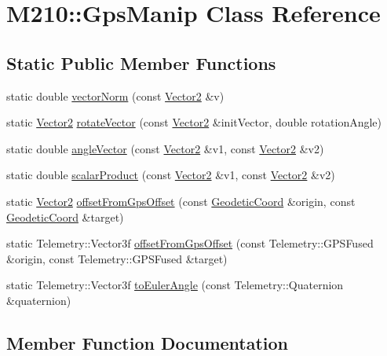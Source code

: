 \hypertarget{class_m210_1_1_gps_manip}{}\section{M210\+:\+:Gps\+Manip Class Reference}
\label{class_m210_1_1_gps_manip}
\subsection*{Static Public Member Functions}
\begin{DoxyCompactItemize}
\item 
static double \mbox{\hyperlink{class_m210_1_1_gps_manip_a8703f003ce3fde60baf51473dd3ec6b7}{vector\+Norm}} (const \mbox{\hyperlink{struct_vector2}{Vector2}} \&v)
\item 
static \mbox{\hyperlink{struct_vector2}{Vector2}} \mbox{\hyperlink{class_m210_1_1_gps_manip_ad3bf0e3449554a4d644316fec52dfa4c}{rotate\+Vector}} (const \mbox{\hyperlink{struct_vector2}{Vector2}} \&init\+Vector, double rotation\+Angle)
\item 
static double \mbox{\hyperlink{class_m210_1_1_gps_manip_a0036870394e772796ff3090bc03bc1de}{angle\+Vector}} (const \mbox{\hyperlink{struct_vector2}{Vector2}} \&v1, const \mbox{\hyperlink{struct_vector2}{Vector2}} \&v2)
\item 
static double \mbox{\hyperlink{class_m210_1_1_gps_manip_a65fa5b63dfcdf3ad4e77e2d7c2f94f58}{scalar\+Product}} (const \mbox{\hyperlink{struct_vector2}{Vector2}} \&v1, const \mbox{\hyperlink{struct_vector2}{Vector2}} \&v2)
\item 
static \mbox{\hyperlink{struct_vector2}{Vector2}} \mbox{\hyperlink{class_m210_1_1_gps_manip_a1b08acaa8e7dc5d77197382806a86d52}{offset\+From\+Gps\+Offset}} (const \mbox{\hyperlink{class_m210_1_1_geodetic_coord}{Geodetic\+Coord}} \&origin, const \mbox{\hyperlink{class_m210_1_1_geodetic_coord}{Geodetic\+Coord}} \&target)
\item 
static Telemetry\+::\+Vector3f \mbox{\hyperlink{class_m210_1_1_gps_manip_aea368ba6b2b436bb46aeece755c4b421}{offset\+From\+Gps\+Offset}} (const Telemetry\+::\+G\+P\+S\+Fused \&origin, const Telemetry\+::\+G\+P\+S\+Fused \&target)
\item 
static Telemetry\+::\+Vector3f \mbox{\hyperlink{class_m210_1_1_gps_manip_aaeb89d7f581d6171aa8bc33b76c9d532}{to\+Euler\+Angle}} (const Telemetry\+::\+Quaternion \&quaternion)
\end{DoxyCompactItemize}


\subsection{Member Function Documentation}
\mbox{\label{class_m210_1_1_gps_manip_a0036870394e772796ff3090bc03bc1de}} 
